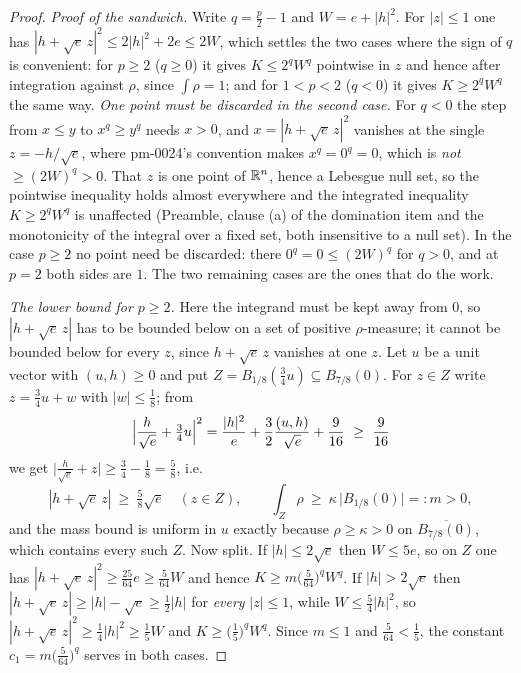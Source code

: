 \begin{proof}
\emph{Proof of the sandwich.}  Write $q=\tfrac p2-1$ and $W=e+|h|^2$.  For
$|z|\le1$ one has $|h+\sqrt e\,z|^2\le2|h|^2+2e\le2W$, which settles the two
cases where the sign of $q$ is convenient: for $p\ge2$ ($q\ge0$) it gives
$K\le2^qW^q$ pointwise in $z$ and hence after integration against $\rho$, since
$\int\rho=1$; and for $1<p<2$ ($q<0$) it gives $K\ge2^qW^q$ the same way.
\emph{One point must be discarded in the second case.}  For $q<0$ the step from
$x\le y$ to $x^q\ge y^q$ needs $x>0$, and $x=|h+\sqrt e\,z|^2$ vanishes at the
single $z=-h/\sqrt e$, where pm-0024's convention makes $x^q=0^q=0$, which is
\emph{not} $\ge(2W)^q>0$.  That $z$ is one point of $\mathbb{R}^n$, hence a Lebesgue
null set, so the pointwise inequality holds almost everywhere and the integrated
inequality $K\ge2^qW^q$ is unaffected (Preamble, clause (a) of the domination
item and the monotonicity of the integral over a fixed set, both insensitive to
a null set).  In the case $p\ge2$ no point need be discarded: there
$0^q=0\le(2W)^q$ for $q>0$, and at $p=2$ both sides are $1$.  The two remaining
cases are the ones that do the work.

\emph{The lower bound for $p\ge2$.}  Here the integrand must be kept away from
$0$, so $|h+\sqrt e\,z|$ has to be bounded below on a set of positive
$\rho$-measure; it cannot be bounded below for every $z$, since $h+\sqrt e\,z$
vanishes at one $z$.  Let $u$ be a unit vector with $(u,h)\ge0$ and put
$Z=B_{1/8}(\tfrac34u)\subseteq B_{7/8}(0)$.  For $z\in Z$ write $z=\tfrac34u+w$
with $|w|\le\tfrac18$; from
\[
\Bigl|\frac h{\sqrt e}+\tfrac34u\Bigr|^2
=\frac{|h|^2}e+\frac32\frac{(u,h)}{\sqrt e}+\frac9{16}\ \ge\ \frac9{16}
\]
we get $\bigl|\tfrac h{\sqrt e}+z\bigr|\ge\tfrac34-\tfrac18=\tfrac58$, i.e.
\[
|h+\sqrt e\,z|\ \ge\ \tfrac58\sqrt e\quad(z\in Z),
\qquad
\int_Z\rho\ \ge\ \kappa\,\bigl|B_{1/8}(0)\bigr|=:m>0 ,
\]
and the mass bound is uniform in $u$ exactly because $\rho\ge\kappa>0$ on
$\overline{B_{7/8}(0)}$, which contains every such $Z$.  Now split.  If
$|h|\le2\sqrt e$ then $W\le5e$, so on $Z$ one has
$|h+\sqrt e\,z|^2\ge\tfrac{25}{64}e\ge\tfrac5{64}W$ and hence
$K\ge m\bigl(\tfrac5{64}\bigr)^qW^q$.  If $|h|>2\sqrt e$ then
$|h+\sqrt e\,z|\ge|h|-\sqrt e\ge\tfrac12|h|$ for \emph{every} $|z|\le1$, while
$W\le\tfrac54|h|^2$, so $|h+\sqrt e\,z|^2\ge\tfrac14|h|^2\ge\tfrac15W$ and
$K\ge\bigl(\tfrac15\bigr)^qW^q$.  Since $m\le1$ and $\tfrac5{64}<\tfrac15$, the
constant $c_1=m\bigl(\tfrac5{64}\bigr)^q$ serves in both cases.


\end{proof}
